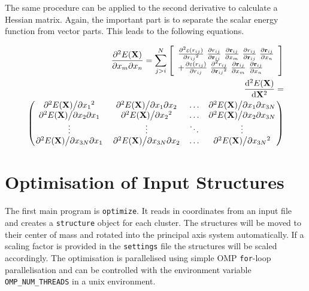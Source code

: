 The same procedure can be applied to the second derivative to calculate a
Hessian matrix. Again, the important part is to separate the scalar energy
function from vector parts. This leads to the following equations.

\begin{align}
    \pdv{E(\mathbf{X})}{x_m}{x_n}=\sum_{j>i}^N\left[  
    \begin{array}{ll}
    \pdv[2]{\varepsilon(r_{ij})}{{r_{ij}}}\  
    \pdv{r_{ij}}{\mathbf{r}_{ij}}\ 
    \pdv{\mathbf{r}_{ij}}{x_m}\ 
    \pdv{r_{ij}}{\mathbf{r}_{ij}}\ 
    \pdv{\mathbf{r}_{ij}}{x_n} \\ 
    +
    \pdv{\varepsilon(r_{ij})}{r_{ij}}\
        \pdv[2]{r_{ij}}{{\mathbf{r}_{ij}}}\ 
    \pdv{\mathbf{r}_{ij}}{x_m}\ 
    \pdv{\mathbf{r}_{ij}}{x_n} 
    \end{array}
    \right]\\
    \begin{aligned}
    \dv[2]{E(\mathbf{X})}{\mathbf{X}}=\\
    \begin{pmatrix}
        \pdv*[2]{E(\mathbf{X})}{{x_1}} & \pdv*{E(\mathbf{X})}{x_1}{x_2} & \ldots & \pdv*{E(\mathbf{X})}{x_1}{x_{3N}}\\
        \pdv*{E(\mathbf{X})}{x_2}{x_1} & \pdv*[2]{E(\mathbf{X})}{{x_2}} & \ldots & \pdv*{E(\mathbf{X})}{x_2}{x_{3N}}\\
        \vdots & \vdots & \ddots & \vdots\\
        \pdv*{E(\mathbf{X})}{x_{3N}}{x_1} & \pdv*{E(\mathbf{X})}{x_{3N}}{x_2} & \ldots & \pdv*[2]{E(\mathbf{X})}{{x_{3N}}}
    \end{pmatrix}
    \end{aligned}
\end{align}

\section{Optimisation of Input Structures}
\label{sec:optimisationofinputstructures}

The first main program is \verb|optimize|. It reads in coordinates from an
input file and creates a \verb|structure| object for each cluster. The
structures will be moved to their center of mass and rotated into the principal
axis system automatically. If a scaling factor is provided in the
\verb|settings| file the structures will be scaled accordingly.  The
optimisation is parallelised using simple \ac{OMP} \verb|for|-loop
parallelisation and can be controlled with the environment variable
\verb|OMP_NUM_THREADS| in a unix environment.

